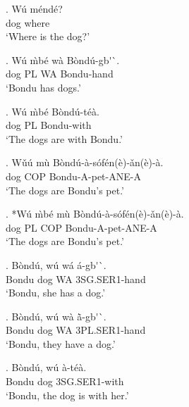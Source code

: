 \documentclass{assets/fieldnotes}
\begin{document}

\exg. W\'{u} m\'{e}nd\'{e}? \\
dog where \\
`Where is the dog?'


\exg. W\'{u} \`{m}b\'{e} w\`{a} B\`{o}nd\'{u}-gb\'{}\`{}. \\ 
dog PL WA Bondu-hand \\
`Bondu has dogs.' 

\exg. W\'{u} \`{m}b\'{e} B\`{o}nd\'{u}-t\'{e}\`{a}. \\ 
dog PL Bondu-with \\
`The dogs are with Bondu.' 

\exg. Wǔ\'{u} m\`{u} B\`{o}nd\'{u}-\`{a}-s\'{o}f\'{e}n(\`{e})-ǎn(\`{e})-\`{a}. \\
dog COP Bondu-A-pet-ANE-A \\
`The dogs are Bondu's pet.' 

\exg. *W\'{u} \`{m}b\'{e} m\`{u} B\`{o}nd\'{u}-\`{a}-s\'{o}f\'{e}n(\`{e})-ǎn(\`{e})-\`{a}. \\
dog PL COP Bondu-A-pet-ANE-A \\
`The dogs are Bondu's pet.' 


\exg. B\`{o}nd\'{u}, w\'{u} w\'{a} \'{a}-gb\'{}\`{}. \\ 
Bondu dog WA 3SG.SER1-hand \\
`Bondu, she has a dog.' 

\exg. B\`{o}nd\'{u}, w\'{u} w\`{a} ã̀-gb\'{}\`{}. \\ 
Bondu dog WA 3PL.SER1-hand \\
`Bondu, they have a dog.' 

\exg. B\`{o}nd\'{u}, w\'{u} \`{a}-t\'{e}\`{a}. \\ 
Bondu dog 3SG.SER1-with \\
`Bondu, the dog is with her.' 
\end{document}

